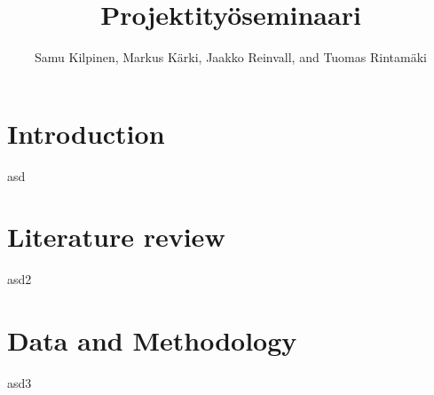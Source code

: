 \title{Projektityöseminaari}
\author{{Samu Kilpinen}, {Markus Kärki}, {Jaakko Reinvall}, and {Tuomas Rintamäki}}
\maketitle

\section{Introduction}
asd

\section{Literature review}
asd2

\section{Data and Methodology}
asd3

